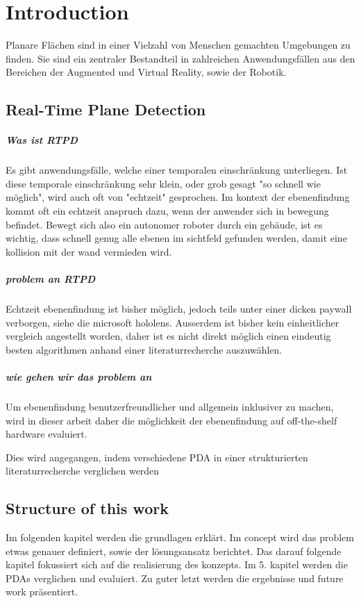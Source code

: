 \documentclass[main.tex]{subfiles}
\begin{document}
\chapter{Introduction}\label{chap:Introduction}

Planare Flächen sind in einer Vielzahl von Menschen gemachten Umgebungen zu finden. 
Sie sind ein zentraler Bestandteil in zahlreichen Anwendungsfällen aus den Bereichen der 
Augmented und Virtual Reality, sowie der Robotik.


\section{Real-Time Plane Detection}
\paragraph*{Was ist RTPD}

Es gibt anwendungsfälle, welche einer temporalen einschränkung unterliegen. Ist diese temporale einschränkung sehr klein, oder grob gesagt "so schnell wie möglich", 
wird auch oft von "echtzeit" gesprochen. Im kontext der ebenenfindung kommt oft ein echtzeit anspruch dazu, wenn der anwender sich in bewegung befindet.
Bewegt sich also ein autonomer roboter durch ein gebäude, ist es wichtig, dass schnell genug alle ebenen im sichtfeld gefunden werden, damit eine kollision mit der wand vermieden wird.


\paragraph*{problem an RTPD}

Echtzeit ebenenfindung ist bisher möglich, jedoch teils unter einer dicken paywall verborgen, siehe die
microsoft hololens. 
Ausserdem ist bisher kein einheitlicher vergleich angestellt worden, daher ist es nicht direkt möglich einen eindeutig besten algorithmen anhand einer literaturrecherche auszuwählen.


\paragraph*{wie gehen wir das problem an}
Um ebenenfindung benutzerfreundlicher und allgemein inklusiver zu machen, wird in dieser
arbeit daher die möglichkeit der ebenenfindung auf off-the-shelf hardware evaluiert.

Dies wird angegangen, indem verschiedene PDA in einer strukturierten literaturrecherche verglichen werden


\section{Structure of this work}

Im folgenden kapitel werden die grundlagen erklärt. Im concept wird das problem etwas genauer definiert,
sowie der lösungsansatz berichtet. 
Das darauf folgende kapitel fokussiert sich auf die realisierung des konzepts.
Im 5. kapitel werden die PDAs verglichen und evaluiert.
Zu guter letzt werden die ergebnisse und future work präsentiert. 
\end{document}
